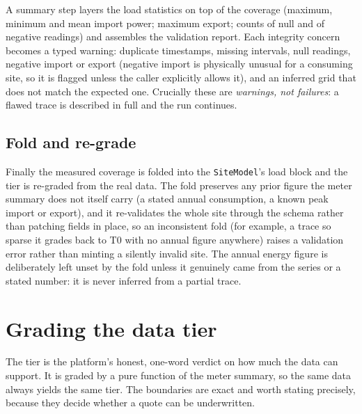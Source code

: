 A summary step layers the load statistics on top of the coverage (maximum, minimum and mean import power; maximum export; counts of null and of negative readings) and assembles the validation report. Each integrity concern becomes a typed warning: duplicate timestamps, missing intervals, null readings, negative import or export (negative import is physically unusual for a consuming site, so it is flagged unless the caller explicitly allows it), and an inferred grid that does not match the expected one. Crucially these are \emph{warnings, not failures}: a flawed trace is described in full and the run continues.

\subsection{Fold and re-grade}

Finally the measured coverage is folded into the \texttt{SiteModel}'s load block and the tier is re-graded from the real data. The fold preserves any prior figure the meter summary does not itself carry (a stated annual consumption, a known peak import or export), and it re-validates the whole site through the schema rather than patching fields in place, so an inconsistent fold (for example, a trace so sparse it grades back to T0 with no annual figure anywhere) raises a validation error rather than minting a silently invalid site. The annual energy figure is deliberately left unset by the fold unless it genuinely came from the series or a stated number: it is never inferred from a partial trace.

\section{Grading the data tier}

The tier is the platform's honest, one-word verdict on how much the data can support. It is graded by a pure function of the meter summary, so the same data always yields the same tier. The boundaries are exact and worth stating precisely, because they decide whether a quote can be underwritten.

